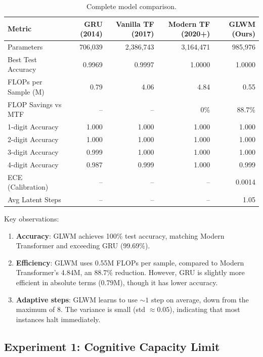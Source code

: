 \documentclass[11pt]{article}
\begin{document}
\begin{table}[H]
\centering
\small
\begin{tabular}{lrrrr}
\toprule
\textbf{Metric} & \textbf{GRU (2014)} & \textbf{Vanilla TF (2017)} & \textbf{Modern TF (2020+)} & \textbf{GLWM (Ours)} \\
\midrule
Parameters & 706,039 & 2,386,743 & 3,164,471 & 985,976 \\
Best Test Accuracy & 0.9969 & 0.9997 & 1.0000 & 1.0000 \\
FLOPs per Sample (M) & 0.79 & 4.06 & 4.84 & 0.55 \\
FLOP Savings vs MTF & -- & -- & 0\% & 88.7\% \\
\midrule
1-digit Accuracy & 1.000 & 1.000 & 1.000 & 1.000 \\
2-digit Accuracy & 1.000 & 1.000 & 1.000 & 1.000 \\
3-digit Accuracy & 0.999 & 1.000 & 1.000 & 1.000 \\
4-digit Accuracy & 0.987 & 0.999 & 1.000 & 0.999 \\
\midrule
ECE (Calibration) & -- & -- & -- & 0.0014 \\
Avg Latent Steps & -- & -- & -- & 1.05 \\
\bottomrule
\end{tabular}
\caption{Complete model comparison.}
\label{tab:main}
\end{table}

Key observations:

\begin{enumerate}
    \item \textbf{Accuracy}: GLWM achieves 100\% test accuracy, matching Modern Transformer and exceeding GRU (99.69\%).
    
    \item \textbf{Efficiency}: GLWM uses 0.55M FLOPs per sample, compared to Modern Transformer's 4.84M, an 88.7\% reduction. However, GRU is slightly more efficient in absolute terms (0.79M), though it has lower accuracy.
    
    \item \textbf{Adaptive steps}: GLWM learns to use $\sim1$ step on average, down from the maximum of 8. The variance is small (std $\approx 0.05$), indicating that most instances halt immediately.
\end{enumerate}

\subsection{Experiment 1: Cognitive Capacity Limit}
\end{document}
